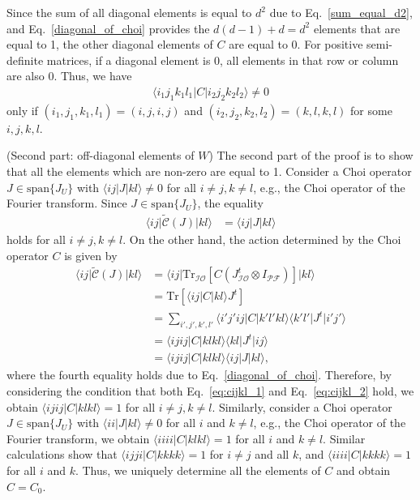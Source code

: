 \documentclass[a4paper,twocolumn,accepted=2022-10-23]{quantumarticle}
\newcommand{\bra}[1]{\langle {#1} \vert}
\newcommand{\ket}[1]{\vert {#1} \rangle}
\newcommand{\Tr}[0]{{\mathrm{Tr}}}
\newcommand{\fcal}[0]{{\mathcal{F}}}
\newcommand{\ical}[0]{{\mathcal{I}}}
\newcommand{\ocal}[0]{{\mathcal{O}}}
\newcommand{\pcal}[0]{{\mathcal{P}}}
\newcommand{\tmap}[1]{\widetilde{\mbox{$\mathcal{#1}$}}}
\theoremstyle{definition}
\begin{document}
Since the sum of all diagonal elements is equal to $d^2$ due to Eq.~\eqref{sum_equal_d2},
and Eq.~\eqref{diagonal_of_choi} provides the $ d(d-1) + d =d^2$ elements that are equal to 1,
the other diagonal elements of $C$ are equal to 0.
For positive semi-definite matrices, if a diagonal element is 0, all elements in that row or column are also 0.
Thus, we have
\begin{align}
\bra{i_1 j_1 k_1 l_1} C \ket{i_2 j_2 k_2 l_2} \neq 0
\end{align}
only if $(i_1,j_1,k_1,l_1) = (i,j,i,j)$ and $(i_2,j_2,k_2,l_2) = (k,l,k,l)$ for some $i,j,k,l$.


(Second part: off-diagonal elements of $W$)\quad
The second part of the proof is to show that all the elements which are non-zero are equal to 1.
Consider a Choi operator $J \in \mathrm{span}\{J_U\}$ with $\bra{ij} J \ket{kl} \neq 0$ for all $i\neq j, k\neq l$,
e.g., the Choi operator of the Fourier transform.
Since $J \in \mathrm{span}\{J_U\}$, the equality
\begin{align}
\bra{ij} \tmap{C}(J) \ket{kl} &= \bra{ij} J \ket{kl} \label{eq:cijkl_1}
\end{align}
holds for all $i\neq j, k\neq l$.
On the other hand, the action determined by the Choi operator $C$ is given by
\begin{align}
\bra{ij} \tmap{C}(J) \ket{kl} &= \bra{ij} \Tr_{\ical \ocal} [C (J^t_{\ical \ocal} \otimes I_{\pcal\fcal})] \ket{kl} \\
&=  \Tr [ \bra{ij} C \ket{kl} J^t ]\\
&= \sum_{i',j',k',l'} \bra{i'j'ij} C \ket{k'l'kl} \bra{k'l'} J^t \ket{i'j'} \\
&= \bra{ijij} C \ket{klkl} \bra{kl} J^t \ket{ij} \\
&= \bra{ijij} C \ket{klkl} \bra{ij} J \ket{kl}, \label{eq:cijkl_2}
\end{align}
where the fourth equality holds due to Eq.~\eqref{diagonal_of_choi}.
Therefore, by considering the condition that both Eq.~\eqref{eq:cijkl_1} and Eq.~\eqref{eq:cijkl_2} hold, we obtain $\bra{ijij} C \ket{klkl} = 1$ for all $i\neq j, k\neq l$.
Similarly, consider a Choi operator $J \in \mathrm{span}\{J_U\}$ with $\bra{ii} J \ket{kl} \neq 0$ for all $i$ and $k\neq l$, e.g., the Choi operator of the Fourier transform,
we obtain $\bra{iiii} C \ket{klkl} = 1$ for all $i$ and $k\neq l$.
Similar calculations show that
$\bra{ijji} C \ket{kkkk} = 1$ for $i \neq j$ and all $k$,
and $\bra{iiii} C \ket{kkkk} = 1$ for all $i$ and $k$.
Thus, we uniquely determine all the elements of $C$ and obtain $C = C_0$.
\end{document}
